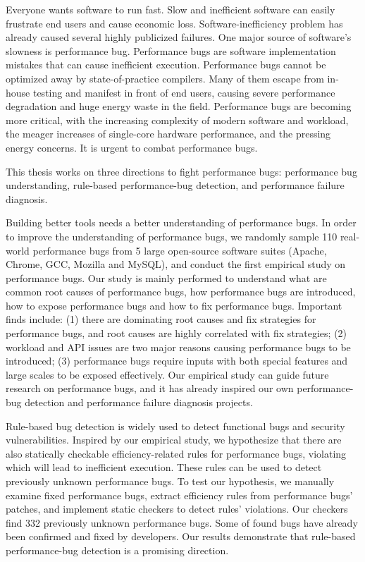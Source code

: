 Everyone wants software to run fast. 
Slow and inefficient software can easily frustrate end users and cause economic loss. 
Software-inefficiency problem has already caused several highly publicized failures. 
One major source of software's slowness is performance bug.
Performance bugs are software implementation mistakes that can cause inefficient execution. 
Performance bugs cannot be optimized away  by state-of-practice compilers. 
Many of them escape from in-house testing and manifest in front of end users, 
causing severe performance degradation and huge energy waste in the field. 
Performance bugs are becoming more critical, 
with the increasing complexity of modern software and workload,
the meager increases of single-core hardware performance, and the 
pressing energy concerns.
It is urgent to combat performance bugs.

This thesis works on three directions to fight performance bugs: 
performance bug understanding, rule-based performance-bug detection, 
and performance failure diagnosis. 

Building better tools needs a better understanding of performance bugs. 
In order to improve the understanding of performance bugs, 
we randomly sample 110 real-world performance bugs from 
5 large open-source software suites (Apache, Chrome, GCC, Mozilla and MySQL), 
and conduct the first empirical study on performance bugs. 
Our study is mainly performed to understand what are common root causes of performance bugs, 
how performance bugs are introduced, how to expose performance bugs and how to fix performance bugs. 
Important finds include: (1) there are dominating root causes and fix strategies for performance bugs, 
and root causes are highly correlated with fix strategies; 
(2) workload and API issues are two major reasons causing performance bugs to be introduced; 
(3) performance bugs require inputs with both special features and large scales to be exposed effectively. 
Our empirical study can guide future research on performance bugs, 
and it has already inspired our own performance-bug detection 
and performance failure diagnosis projects. 

Rule-based bug detection is widely used to detect functional bugs and security vulnerabilities. 
Inspired by our empirical study, we hypothesize that there are also statically 
checkable efficiency-related rules for performance bugs, 
violating which will lead to inefficient execution. 
These rules can be used to detect previously unknown performance bugs. 
To test our hypothesis, we manually examine fixed performance bugs, 
extract efficiency rules from performance bugs' patches, and implement static checkers to detect rules' violations. 
Our checkers find 332 previously unknown performance bugs. 
Some of found bugs have already been confirmed and fixed by developers. 
Our results demonstrate that rule-based performance-bug detection is a promising direction. 

